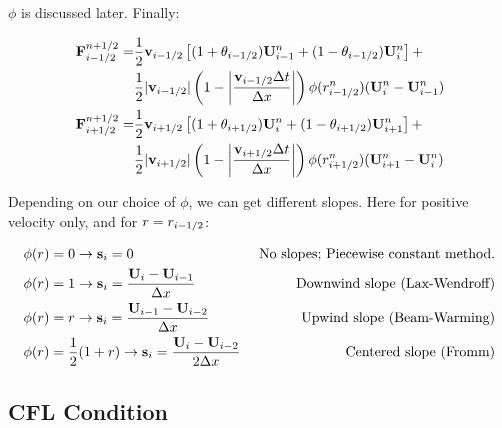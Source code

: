 $\phi$ is discussed later. Finally:

\begin{align}
	\mathbf{F}_{i-1/2}^{n+1/2} = 
		&\frac{1}{2} \mathbf{v}_{i-1/2} \left[  (1 + \theta_{i-1/2}) \mathbf{U}_{i-1}^n + (1 - \theta_{i-1/2})  \mathbf{U}_{i}^n \right] +\nonumber\\
		&\frac{1}{2}| \mathbf{v}_{i-1/2} | \left( 1 - \left| \frac{\mathbf{v}_{i-1/2} \Delta t}{\Delta x} \right| \right) \phi(r_{i-1/2}^n) (\mathbf{U}_i^n - \mathbf{U}_{i-1}^n ) \label{eq:advection_phi1}\\
	\mathbf{F}_{i+1/2}^{n+1/2} = 
		&\frac{1}{2} \mathbf{v}_{i+1/2} \left[  (1 + \theta_{i+1/2}) \mathbf{U}_{i}^n + (1 - \theta_{i+1/2})  \mathbf{U}_{i+1}^n \right] +\nonumber\\
		&\frac{1}{2}| \mathbf{v}_{i+1/2} | \left( 1 - \left| \frac{\mathbf{v}_{i+1/2} \Delta t}{\Delta x} \right| \right) \phi(r_{i+1/2}^n) (\mathbf{U}_{i+1}^n - \mathbf{U}_{i}^n ) \label{eq:advection_phi2}
\end{align}







Depending on our choice of $\phi$, we can get different slopes. Here for positive velocity only, and for $r = r_{i-1/2}$:

\begin{align*}
	\phi(r) & = 0 \rightarrow \mathbf{s}_i = 0 
		&\text{ No slopes; Piecewise constant method.}\\
	\phi(r) & = 1 \rightarrow \mathbf{s}_i = \frac{\mathbf{U}_{i} - \mathbf{U}_{i-1}}{\Delta x} 
		&\text{ Downwind slope (Lax-Wendroff)} \\
	\phi(r) & = r \rightarrow \mathbf{s}_i = \frac{\mathbf{U}_{i-1} - \mathbf{U}_{i-2}}{\Delta x} 
		&\text{Upwind slope (Beam-Warming)} \\
	\phi(r) & = \frac{1}{2} (1 + r) \rightarrow \mathbf{s}_i = \frac{\mathbf{U}_{i} - \mathbf{U}_{i-2}}{2 \Delta x} 
		&\text{ Centered slope (Fromm)} \\
\end{align*}

















\subsection{CFL Condition}

